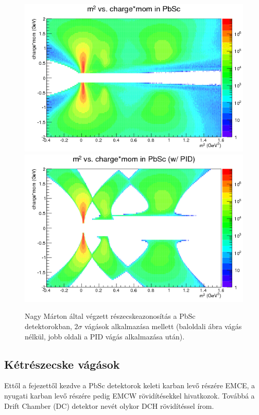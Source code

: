 \documentclass[11pt,a4paper]{article}
\numberwithin{equation}{subsection}
\numberwithin{figure}{section}
\begin{document}
\begin{figure}[H]
\centering
\includegraphics[scale=0.39]{pic/dat/nm/h_m2sum_pbsc_all.png}
\includegraphics[scale=0.39]{pic/dat/nm/h_m2sum_pbsc_pid.png}
\caption{Nagy Márton által végzett részecskeazonosítás a PbSc detektorokban, $2\sigma$ vágások alkalmazása mellett (baloldali ábra vágás nélkül, jobb oldali a PID vágás alkalmazása után).}
\label{fig:m2sum1}
\end{figure}

\subsection{Kétrészecske vágások}

Ettől a fejezettől kezdve a PbSc detektorok keleti karban levő részére EMCE, a nyugati karban levő részére pedig EMCW rövidítésekkel hivatkozok. Továbbá a Drift Chamber (DC) detektor nevét olykor DCH rövidítéssel írom.
\end{document}

